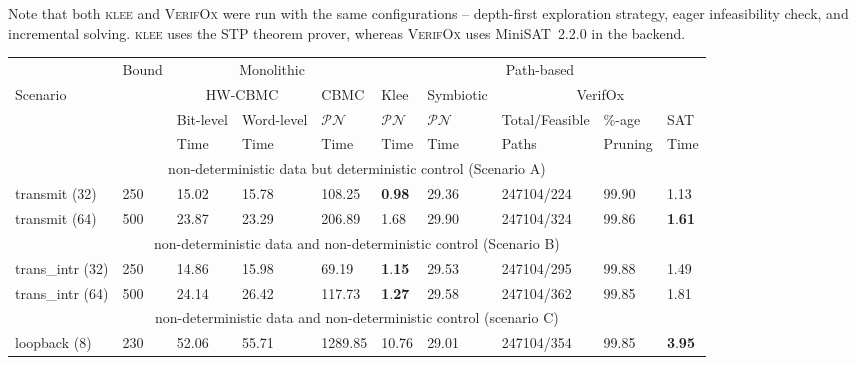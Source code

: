 \documentclass[sigconf]{acmart}
\newcommand{\tool}[1]{\textsc{#1}\xspace}
\newcommand{\verifox}{\tool{VerifOx}}
\newcommand{\klee}{\tool{klee}}
\newcommand{\Omit}[1]{}
\begin{document}
Note that both \klee and \verifox were run with the same configurations --
depth-first exploration strategy, eager infeasibility check, and incremental
solving.  \klee uses the STP theorem prover, whereas \verifox uses
MiniSAT~2.2.0 in the backend.

\Omit
{Besides SAT backend, \verifox also have a SMT backend. We ran our 
experiments with Z3 and observe higher verification times for Z3 compared 
to MiniSAT. So, we do not report the verification with SMT solvers.   }

\begin{table}
\begin{center}
{
\begin{scriptsize}
\begin{tabular}{|l|l|l|l|l|l|l|l|l|l|}
\hline
  & Bound & \multicolumn{3}{c|}{Monolithic} & \multicolumn{5}{c|}{Path-based} \\ 
\cline{3-10}
 Scenario &  & \multicolumn{2}{c|}{HW-CBMC} & CBMC & Klee & Symbiotic & \multicolumn{3}{c|}{VerifOx} \\ 
\cline{3-10}
      &       &  Bit-level & Word-level & $\mathcal{PN}$ & $\mathcal{PN}$ & $\mathcal{PN}$ & Total/Feasible & \%-age & SAT \\
\cline{1-7}
      &       &   Time     &   Time      & Time  &  Time & Time & Paths & Pruning & Time \\
\cline{1-10}      
\multicolumn{10}{|c|}{non-deterministic data but deterministic control (Scenario A)} \\ \hline
transmit (32) & 250 & 15.02 & 15.78 & 108.25 & \textbf{0}.\textbf{98} & 29.36 & 247104/224 & 99.90 & 1.13 \\ 
transmit (64) & 500 & 23.87 & 23.29 & 206.89 & 1.68 & 29.90 & 247104/324 & 99.86 & \textbf{1}.\textbf{61}  \\ \hline 
\multicolumn{10}{|c|}{non-deterministic data and non-deterministic control
(Scenario B)} \\ \hline
trans\_intr (32) & 250 & 14.86 & 15.98 & 69.19 & \textbf{1}.\textbf{15} & 29.53 & 247104/295 & 99.88 & 1.49 \\
trans\_intr (64) & 500 & 24.14 & 26.42 & 117.73 & \textbf{1}.\textbf{27} & 29.58 & 247104/362 & 99.85 & 1.81 \\ \hline
\multicolumn{10}{|c|}{non-deterministic data and non-deterministic control
(scenario C)} \\ \hline
loopback (8)  & 230 & 52.06 & 55.71 & 1289.85 & 10.76 & 29.01 & 247104/354 & 99.85 & \textbf{3}.\textbf{95} \\ 

\end{tabular}
\end{scriptsize}}
\end{center}
\end{table}
\end{document}
